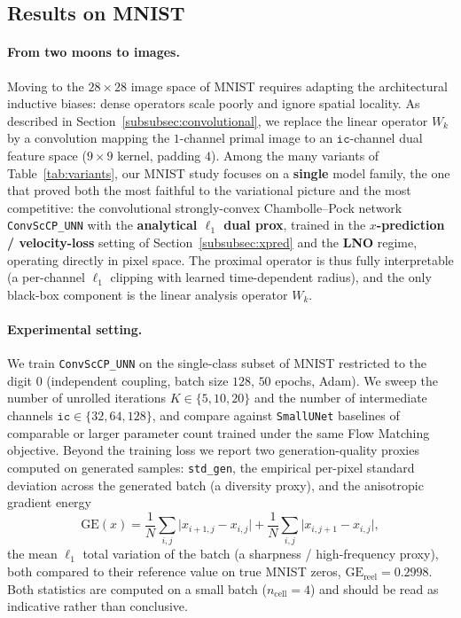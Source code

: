 \subsection{Results on MNIST}
\label{subsec:mnist}

\paragraph{From two moons to images.} Moving to the $28\times 28$ image space of
MNIST requires adapting the architectural inductive biases: dense operators scale
poorly and ignore spatial locality. As described in
Section~\ref{subsubsec:convolutional}, we replace the linear operator $W_k$ by a
convolution mapping the $1$-channel primal image to an $\texttt{ic}$-channel dual
feature space ($9\times 9$ kernel, padding $4$). Among the many variants of
Table~\ref{tab:variants}, our MNIST study focuses on a \textbf{single} model
family, the one that proved both the most faithful to the variational picture and
the most competitive: the convolutional strongly-convex Chambolle--Pock network
\texttt{ConvScCP\_UNN} with the \textbf{analytical $\ell_1$ dual prox}, trained in
the \textbf{$x$-prediction / velocity-loss} setting of
Section~\ref{subsubsec:xpred} and the \textbf{LNO} regime, operating directly in
pixel space. The proximal operator is thus fully interpretable (a per-channel
$\ell_1$ clipping with learned time-dependent radius), and the only black-box
component is the linear analysis operator $W_k$.

\paragraph{Experimental setting.} We train \texttt{ConvScCP\_UNN} on the
single-class subset of MNIST restricted to the digit $0$ (independent coupling,
batch size $128$, $50$ epochs, Adam). We sweep the number of unrolled iterations
$K \in \{5,10,20\}$ and the number of intermediate channels
$\texttt{ic} \in \{32,64,128\}$, and compare against \texttt{SmallUNet}
baselines of comparable or larger parameter count trained under the same Flow
Matching objective. Beyond the training loss we report two generation-quality
proxies computed on generated samples: \texttt{std\_gen}, the empirical
per-pixel standard deviation across the generated batch (a diversity proxy), and
the anisotropic gradient energy
\[
    \mathrm{GE}(x) = \frac1N\sum_{i,j}\lvert x_{i+1,j}-x_{i,j}\rvert
                   + \frac1N\sum_{i,j}\lvert x_{i,j+1}-x_{i,j}\rvert ,
\]
the mean $\ell_1$ total variation of the batch (a sharpness / high-frequency
proxy), both compared to their reference value on true MNIST zeros,
$\mathrm{GE}_{\text{reel}} = 0.2998$. Both statistics are computed on a small
batch ($n_{\text{cell}} = 4$) and should be read as indicative rather than
conclusive.

